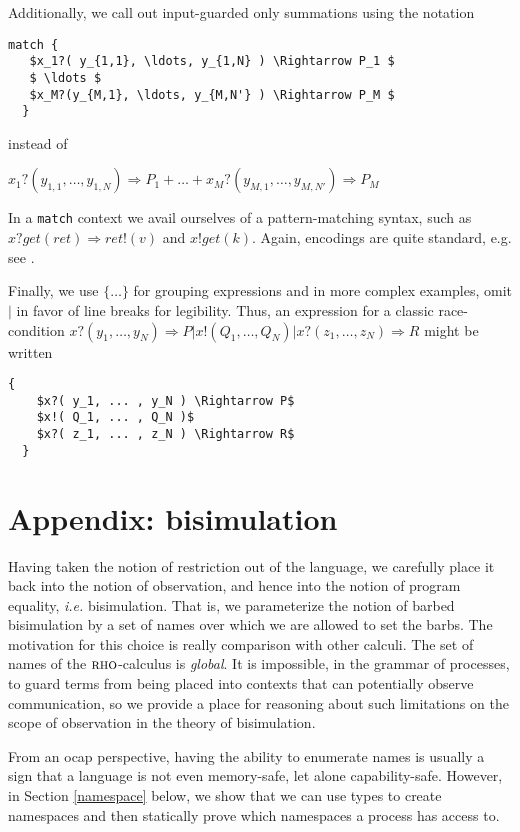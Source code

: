 \documentclass[]{acm_proc_article-sp}
\newcommand{\id}[1]{\texttt{#1}}
\newcommand{\juxtap}{\mathbin{\id{|}}}
\newcommand{\binpar}[2]{#1 \juxtap #2}
\numberwithin{equation}{subsection}
\newcommand{\rhoc}{${\textsc{rho}}$-calculus}
\begin{document}
Additionally, we call out input-guarded only summations using the notation

\begin{lstlisting}[mathescape]
  match { 
   $x_1?( y_{1,1}, \ldots, y_{1,N} ) \Rightarrow P_1 $
   $ \ldots $
   $x_M?(y_{M,1}, \ldots, y_{M,N'} ) \Rightarrow P_M $ 
  }
\end{lstlisting}

\noindent instead of 

$x_1?( y_{1,1}, \ldots, y_{1,N} ) \Rightarrow P_1 + \ldots + x_M?( y_{M,1},\ldots, y_{M,N'} ) \Rightarrow P_M$

In a \texttt{match} context we avail ourselves of a pattern-matching
syntax, such as $x ? get( ret ) \Rightarrow ret!( v )$ and $x ! get( k
)$. Again, encodings are quite standard, e.g. see
\cite{Brown05piduce:a}.

Finally, we use $\{ \ldots \}$ for grouping expressions and in more complex examples, omit
$\binpar{}{}$ in favor of line breaks for legibility. Thus, an expression for a classic race-condition $\binpar{ x?( y_1, \ldots, y_N ) \Rightarrow P}{\binpar{x!( Q_1, \ldots, Q_N )}{ x?( z_1, \ldots, z_N ) \Rightarrow R}}$ might be written
\begin{lstlisting}[mathescape]
  {
    $x?( y_1, ... , y_N ) \Rightarrow P$
    $x!( Q_1, ... , Q_N )$
    $x?( z_1, ... , z_N ) \Rightarrow R$
  }
\end{lstlisting}

\section{Appendix: bisimulation}

Having taken the notion of restriction out of the language, we
carefully place it back into the notion of observation, and hence into
the notion of program equality, {\em i.e.} bisimulation. That is, we
parameterize the notion of barbed bisimulation by a set of names over
which we are allowed to set the barbs. The motivation for this choice
is really comparison with other calculi. The set of names of the
{\rhoc} is \textit{global}. It is impossible, in the grammar of
processes, to guard terms from being placed into contexts that can
potentially observe communication, so we provide a place for
reasoning about such limitations on the scope of observation in the
theory of bisimulation.

From an ocap perspective, having the ability to enumerate names is
usually a sign that a language is not even memory-safe, let alone
capability-safe.  However, in Section \ref{namespace} below, we show
that we can use types to create namespaces and then statically prove
which namespaces a process has access to.
\end{document}
